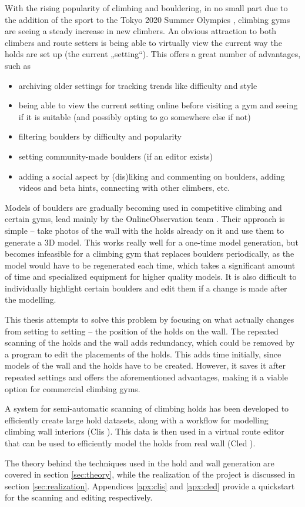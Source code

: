 
With the rising popularity of climbing and bouldering, in no small part due to the addition of the sport to the Tokyo 2020 Summer Olympics \cite{olympics}, climbing gyms are seeing a steady increase in new climbers.
An obvious attraction to both climbers and route setters is being able to virtually view the current way the holds are set up (the current „setting“).
This offers a great number of advantages, such as

\begin{itemize}
	\item archiving older settings for tracking trends like difficulty and style
	\item being able to view the current setting online before visiting a gym and seeing if it is suitable (and possibly opting to go somewhere else if not)
	\item filtering boulders by difficulty and popularity
	\item setting community-made boulders (if an editor exists)
	\item adding a social aspect by (dis)liking and commenting on boulders, adding videos and beta hints, connecting with other climbers, etc.
\end{itemize}

Models of boulders are gradually becoming used in competitive climbing and certain gyms, lead mainly by the OnlineObservation team \cite{onlineobservation}.
Their approach is simple -- take photos of the wall with the holds already on it and use them to generate a 3D model.
This works really well for a one-time model generation, but becomes infeasible for a climbing gym that replaces boulders periodically, as the model would have to be regenerated each time, which takes a significant amount of time and specialized equipment for higher quality models.
It is also difficult to individually highlight certain boulders and edit them if a change is made after the modelling.

This thesis attempts to solve this problem by focusing on what actually changes from setting to setting -- the position of the holds on the wall.
The repeated scanning of the holds and the wall adds redundancy, which could be removed by a program to edit the placements of the holds.
This adds time initially, since models of the wall and the holds have to be created.
However, it saves it after repeated settings and offers the aforementioned advantages, making it a viable option for commercial climbing gyms.

A system for semi-automatic scanning of climbing holds has been developed to efficiently create large hold datasets, along with a workflow for modelling climbing wall interiors (Clis \cite{clis}).
This data is then used in a virtual route editor that can be used to efficiently model the holds from real wall (Cled \cite{cled}).

The theory behind the techniques used in the hold and wall generation are covered in section \ref{sec:theory}, while the realization of the project is discussed in section \ref{sec:realization}.
Appendices \ref{apx:clis} and \ref{apx:cled} provide a quickstart for the scanning and editing respectively.
